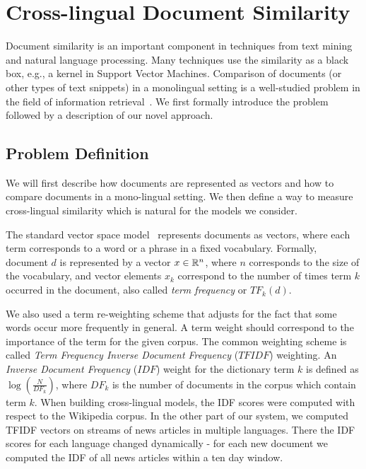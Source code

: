 %
\chapter{Cross-lingual Document Similarity}\label{chap:crosslingual}

Document similarity is an important component in techniques from text mining and natural language processing. 
Many techniques use the similarity as a black box, e.g., a kernel in Support Vector Machines. 
Comparison of documents (or other types of text snippets) in a monolingual setting is a 
well-studied problem in the field of information retrieval~\cite{Salton88term-weightingapproaches}. 
We first formally introduce the problem followed by a description of our novel approach.

\section{Problem Definition}\label{chap:crosslingual:problem}
We will first describe how documents are represented as vectors and how to compare documents in 
a mono-lingual setting. We then define a way to measure cross-lingual similarity which is natural 
for the models we consider.

The standard vector space model~\cite{Salton88term-weightingapproaches} represents documents as 
vectors, where each term corresponds to a word or a phrase in a fixed vocabulary. Formally, 
document $d$ is represented by a vector $x \in \mathbb{R}^n$, where $n$ corresponds to the size 
of the vocabulary, and vector elements $x_k$ correspond to the number of times term $k$ 
occurred in the document, also called \emph{term frequency} or $TF_k(d)$.

We also used a term re-weighting scheme that adjusts for the fact that some words occur 
more frequently in general. A term weight should correspond to the importance of the term 
for the given corpus. The common weighting scheme is called \emph{Term Frequency Inverse 
Document Frequency} ($TFIDF$) weighting. An \emph{Inverse Document Frequency} ($IDF$) weight 
for the dictionary term $k$ is defined as $\log\left( \frac{N}{DF_k} \right)$, where 
$DF_k$ is the number of documents in the corpus which contain term $k$.
When building cross-lingual models, the IDF scores were computed with respect to the 
Wikipedia corpus. In the other part of our system, we computed TFIDF vectors on streams 
of news articles in multiple languages. There the IDF scores for each language changed 
dynamically - for each new document we computed the IDF of all news articles within 
a ten day window.

